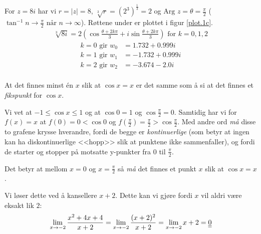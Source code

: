 \documentclass[a4paper,norsk,12pt]{article}
\begin{document}
For $z=8i$ har vi $r = |z| = 8$, $\sqrt[3]{r} = (2^3)^\frac{1}{3} = 2$ og
$\text{Arg }z = \theta = \frac{\pi}{2}$ ($\tan^{-1}{n} \to \frac{\pi}{2} \text{ når } n \to
\infty$). Røttene under er plottet i figur \vref{plot.1c}.
%
\begin{equation*}
\begin{split}
  \sqrt[3]{8i} = 2\left( \cos{\frac{\theta+2k\pi}{3}} +
  i\sin{\frac{\theta+2k\pi}{3}} \right) \text{ for } k = 0, 1, 2
\end{split}
\end{equation*}
%
\begin{equation*}
\begin{split}
  k = 0 \text{ gir } w_0 & = 1.732 + 0.999i \\
  k = 1 \text{ gir } w_1 & = -1.732 + 0.999i \\
  k = 2 \text{ gir } w_2 & = -3.674 - 2.0i \\
\end{split}
\end{equation*}


At det finnes minst én $x$ slik at $\cos{x}=x$ er det samme som å si at det
finnes et \textit{fikspunkt} for $\cos{x}$.

Vi vet at $-1 \leq \cos{x} \leq 1$ og at $\cos{0} = 1$ og $\cos{\frac{\pi}{2}}
= 0$. Samtidig har vi for $f(x)=x$ at $f(0) = 0 < \cos{0}$ og $f(\frac{\pi}{2})
= \frac{\pi}{2} > \cos{\frac{\pi}{2}}$. Med andre ord \textit{må} disse to
grafene krysse hverandre, fordi de begge er \textit{kontinuerlige} (som betyr
at ingen kan ha diskontinuerlige <<hopp>> slik at punktene ikke sammenfaller),
og fordi de starter og stopper på motsatte y-punkter fra $0$ til
$\frac{\pi}{2}$.

Det betyr at mellom $x=0$ og $x=\frac{\pi}{2}$ så \textit{må} det finnes et punkt $x$
slik at $\cos{x} = x$.


Vi løser dette ved å kansellere $x+2$. Dette kan vi gjøre
fordi $x$ vil aldri være eksakt lik $2$:
\begin{equation*}
\begin{split}
  \lim_{x \to -2}{\frac{x^2+4x+4}{x+2}} = \lim_{x \to -2}{\frac{(x+2)^2}{x+2}}
  = \lim_{x \to -2}{x+2} = {\underline{\underline{0}}}
\end{split}
\end{equation*}
\end{document}

